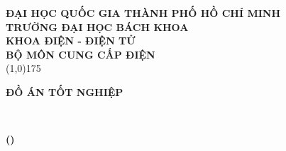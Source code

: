 \begin{titlepage}



\begin{center}
    \vspace{-12pt}  
    \textbf{ĐẠI HỌC QUỐC GIA THÀNH PHỐ HỒ CHÍ MINH} \\[-7pt]
    \textbf{TRƯỜNG ĐẠI HỌC BÁCH KHOA}\\[-7pt]
    \textbf{KHOA ĐIỆN - ĐIỆN TỬ}\\[-7pt]
    \textbf{BỘ MÔN CUNG CẤP ĐIỆN}\\[-7pt]
    \vspace{-7pt}
    \line (1,0){175} 
\end{center}

\vspace{0.5cm}
\begin{figure}[H]
     \centering
     
\end{figure}

\vspace{.3cm}
\begin{center}
    \fontsize{16pt}{0pt}\selectfont \textbf{ĐỒ ÁN TỐT NGHIỆP}\\
    \vspace{12pt}
\end{center}

\begin{center}
    \begin{adjustwidth}{0.5cm}{0.5cm}
        \begin{center}
                 \textbf{
                 \fontsize{18pt}{0pt} 
                 \selectfont 
                 \titlevn}\\
        \end{center}
     \end{adjustwidth}
    
    \vspace{15pt}
    \begin{adjustwidth}{0.5cm}{0.5cm}
        \begin{center}
                 \textbf{
                 \fontsize{15pt}{0pt} 
                 \selectfont 
                 (\titleeng)}\\
        \end{center}
     \end{adjustwidth}
\vspace{1.5cm}
\end{center}


\end{titlepage}
